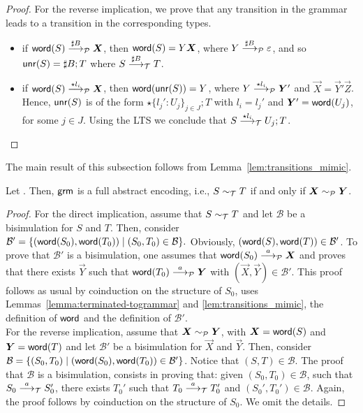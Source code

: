 \begin{proof}
	For the reverse implication, we prove that any transition in the
	grammar leads to a transition in the corresponding types.
	\begin{itemize}
		\item if $\word(S)\LTSderivesP[\sharp B] \vec X$, then
		$\word(S) = Y \vec X$, where $Y\LTSderivesP[\sharp B] \varepsilon$,
		and so $\Unravel(S) = \sharp B; T$ where $S\LTSderives[\sharp B] T$.
		\item if $\word(S) \LTSderivesP[\star l_i] \vec X $, then
		$\word(\Unravel(S)) = Y $, where $Y\LTSderivesP[\star l_i] \vec Y'$
		and $\vec X = \vec Y' \vec Z$.
		Hence, $\Unravel (S)$ is of the form $\star\{l_j' :U_j\}_{j\in J};T$ with $l_i = l_j'$ and
		$\vec Y' = \word(U_j)$, for some $j\in J$. Using 
		the LTS we conclude that 
		$S \LTSderives[\star l_i] U_j ; T$.
	\end{itemize}
\end{proof}

The main result of this subsection follows from
Lemma~\ref{lem:transitions_mimic}.

\begin{theorem}
  \label{thm:equiv_coincide}
  Let \grmcontext. Then, $\grm$ is a full abstract encoding, i.e.,
  $S \TypeEquiv T$ if and only if $\vec X \ProdEquiv \vec Y$.
\end{theorem}

\begin{proof}
For the direct implication, assume that $S \TypeEquiv T$ and let
$\mathcal{B}$ be a bisimulation for $S$ and $T$. Then, consider 
$ \mathcal{B}' = 
\{(\word (S_0), \word(T_0))\mid (S_0,T_0)\in \mathcal{B} \}. $
Obviously, $(\word(S), \word(T))\in \mathcal{B}'$. To prove that
$\mathcal{B}'$ is a bisimulation, one assumes that 
$\word (S_0)\LTSderivesP \vec X $ and proves that there exists
$\vec Y$ such that $\word (T_0)\LTSderivesP \vec Y $
with $(\vec X, \vec Y)\in \mathcal{B}'$. This proof follows 
as usual by coinduction on the structure of $S_0$, uses 
Lemmas~\ref{lemma:terminated-togrammar}
and \ref{lem:transitions_mimic}, the definition of $\word$
and the definition of $\mathcal{B}'$. \smallskip\\
For the reverse implication, assume that 
$\vec X \ProdEquiv \vec Y$, with $\vec X = \word (S)$ and
$\vec Y = \word(T)$ and let $\mathcal{B}'$ be a bisimulation
for $\vec X$ and $\vec Y$. Then, consider
$\mathcal{B} = \{(S_0, T_0)\mid (\word(S_0),\word(T_0))\in \mathcal{B}'\}$.
Notice that $(S,T)\in \mathcal{B}$.
The proof that $\mathcal{B}$ is a bisimulation, consists in proving that:
given $(S_0, T_0)\in \mathcal{B}$, such that $S_0\LTSderives S_0'$,
there exists $T_0'$ such that $T_0\LTSderives T_0'$
and $(S_0',T_0')\in \mathcal{B}$. Again, the proof
follows by coinduction on the structure of $S_0$. 
We omit the details. 
\end{proof}


